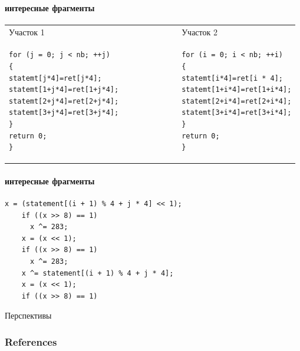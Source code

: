\documentclass{beamer}              %
\begin{document}
\begin{frame}[fragile]
  \framesubtitle{интересные фрагменты}
  
\noindent
\begin{tabular}{|p{6cm}|p{6cm}|}
Участок 1  &  Участок 2 \\
\begin{lstlisting}
for (j = 0; j < nb; ++j)               
{                                      
statemt[j*4]=ret[j*4];           
statemt[1+j*4]=ret[1+j*4];   
statemt[2+j*4]=ret[2+j*4];   
statemt[3+j*4]=ret[3+j*4];   
}                                      
return 0;                              
}                                      
\end{lstlisting}&
\begin{lstlisting}
for (i = 0; i < nb; ++i)
{
statemt[i*4]=ret[i * 4];
statemt[1+i*4]=ret[1+i*4];
statemt[2+i*4]=ret[2+i*4];
statemt[3+i*4]=ret[3+i*4];
}
return 0;
}
\end{lstlisting}
\end{tabular} 
\label{clone_listing_ex}
  
\end{frame}

\begin{frame}[fragile]
\framesubtitle{интересные фрагменты}
\begin{lstlisting}[frame=single]
	x = (statement[(i + 1) % 4 + j * 4] << 1);
	if ((x >> 8) == 1)
	  x ^= 283;
	x = (x << 1);
	if ((x >> 8) == 1)
	  x ^= 283;
	x ^= statement[(i + 1) % 4 + j * 4];
	x = (x << 1);
	if ((x >> 8) == 1)
\end{lstlisting}
\label{clone_listing}
\end{frame}

\begin{frame}{Перспективы}
  
\end{frame}


\begin{frame}[allowframebreaks]
        \frametitle{References}
        
        
\end{frame}
\end{document}
